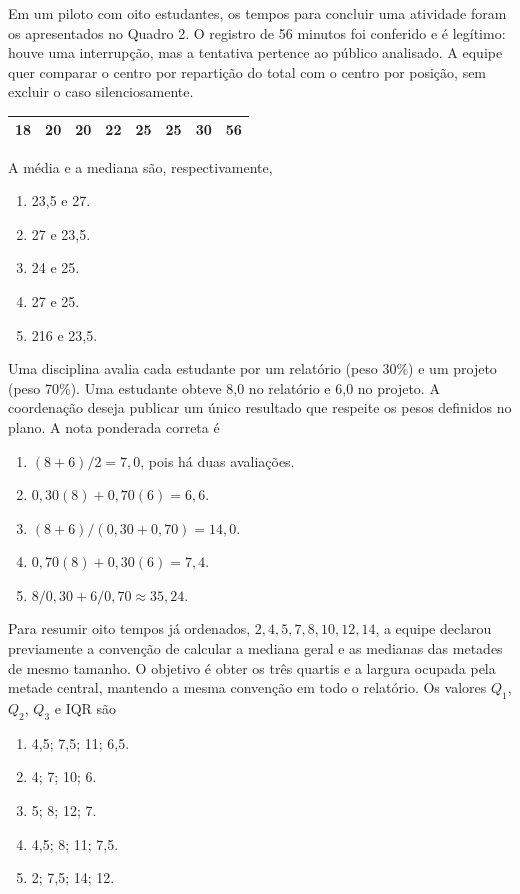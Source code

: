 \TextoBase Em um piloto com oito estudantes, os tempos para concluir uma atividade foram os apresentados no Quadro 2. O registro de 56 minutos foi conferido e é legítimo: houve uma interrupção, mas a tentativa pertence ao público analisado. A equipe quer comparar o centro por repartição do total com o centro por posição, sem excluir o caso silenciosamente.
\begin{DocumentBox}
\centering\begin{tabular}{@{}rrrrrrrr@{}}\toprule
18 & 20 & 20 & 22 & 25 & 25 & 30 & 56\\\bottomrule
\end{tabular}
\end{DocumentBox}
\FonteDidatica
\Comando A média e a mediana são, respectivamente,
\begin{enumerate}[label=\Alph*)]\item 23,5 e 27.\item 27 e 23,5.\item 24 e 25.\item 27 e 25.\item 216 e 23,5.\end{enumerate}

\TextoBase Uma disciplina avalia cada estudante por um relatório (peso 30\%) e um projeto (peso 70\%). Uma estudante obteve 8,0 no relatório e 6,0 no projeto. A coordenação deseja publicar um único resultado que respeite os pesos definidos no plano.
\FonteDidatica
\Comando A nota ponderada correta é
\begin{enumerate}[label=\Alph*)]
\item $(8+6)/2=7{,}0$, pois há duas avaliações.
\item $0{,}30(8)+0{,}70(6)=6{,}6$.
\item $(8+6)/(0{,}30+0{,}70)=14{,}0$.
\item $0{,}70(8)+0{,}30(6)=7{,}4$.
\item $8/0{,}30+6/0{,}70\approx35{,}24$.
\end{enumerate}
\TextoBase Para resumir oito tempos já ordenados, $2,4,5,7,8,10,12,14$, a equipe declarou previamente a convenção de calcular a mediana geral e as medianas das metades de mesmo tamanho. O objetivo é obter os três quartis e a largura ocupada pela metade central, mantendo a mesma convenção em todo o relatório.
\FonteDidatica
\Comando Os valores $Q_1$, $Q_2$, $Q_3$ e IQR são
\begin{enumerate}[label=\Alph*)]\item 4,5; 7,5; 11; 6,5.\item 4; 7; 10; 6.\item 5; 8; 12; 7.\item 4,5; 8; 11; 7,5.\item 2; 7,5; 14; 12.\end{enumerate}

